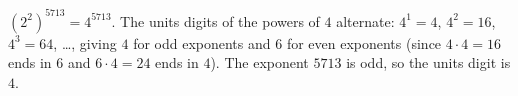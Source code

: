 $\left(2^2\right)^{5713}=4^{5713}$. The units digits of the powers of $4$ alternate: $4^1=4$, $4^2=16$, $4^3=64$, \dots, giving $4$ for odd exponents and $6$ for even exponents (since $4\cdot4=16$ ends in $6$ and $6\cdot4=24$ ends in $4$). The exponent $5713$ is odd, so the units digit is $\boxed{4}$.
